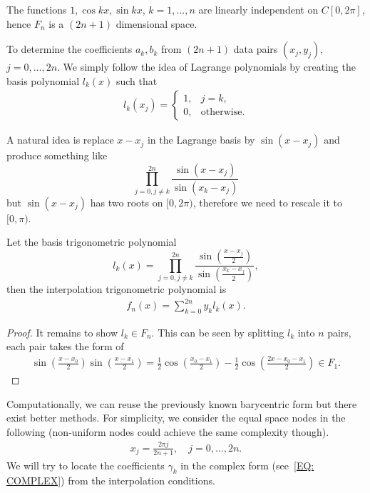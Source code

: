 \begin{corollary}
\label{Cor: 2-Fou-bas-ind}
    The functions $1, \cos kx, \sin kx$, $k=1,\dots, n$ are linearly independent on $C [0, 2\pi]$, hence $F_n$ is a $(2n+1)$ dimensional space.
\end{corollary}
To determine the coefficients $a_k, b_k$ from $(2n+1)$ data pairs $(x_j, y_j)$, $j=0, \dots, 2n$. We simply follow the idea of Lagrange polynomials by creating the basis polynomial $l_k(x)$ such that
\begin{eqnarray}
    l_k(x_j) = \begin{cases}
        1, &j = k,\\
        0,&\text{otherwise}.
    \end{cases} 
\end{eqnarray}
\begin{remark}
    A natural idea is replace $x - x_j$ in the Lagrange basis by $\sin(x - x_j)$ and produce something like 
$$\prod_{j=0, j\neq k}^{2n}\frac{\sin(x - x_j)}{\sin(x_k - x_j)}$$
but $\sin(x - x_j)$ has two roots on $[0, 2\pi)$, therefore we need to rescale it to $[0, \pi)$.
\end{remark}
\begin{theorem}\label{THM: TRIG}
    Let the basis trigonometric polynomial 
    $$l_k(x) =\prod_{j=0, j\neq k}^{2n}\frac{\sin(\frac{x - x_j}{2})}{\sin(\frac{x_k - x_j}{2})} ,$$
    then the interpolation trigonometric polynomial is 
    \begin{eqnarray}
        f_n(x) = \sum_{k=0}^{2n} y_k l_k(x).
    \end{eqnarray}
\end{theorem}
\begin{proof}
    It remains to show $l_k\in F_n$. This can be seen by splitting $l_k$ into $n$ pairs, each pair takes the form of 
    \begin{eqnarray}
        \sin(\frac{x-x_0}{2})\sin(\frac{x-x_1}{2}) = \frac{1}{2}\cos\left( \frac{x_0 - x_1}{2}\right) - \frac{1}{2}\cos\left(\frac{2x - x_0 - x_1}{2}\right)\in F_1.
    \end{eqnarray}
\end{proof}
Computationally, we can reuse the previously known barycentric form but there exist better methods. For simplicity, we consider the equal space nodes in the following (non-uniform nodes could achieve the same complexity though). 
\begin{eqnarray}
    x_j = \frac{2\pi j}{2n + 1}, \quad j = 0, \dots, 2n. 
\end{eqnarray}
We will try to locate the coefficients $\gamma_k$ in the complex form (see~\eqref{EQ: COMPLEX}) from the interpolation conditions.
